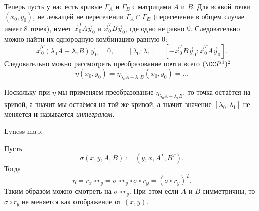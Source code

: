 \documentclass[12pt,a4paper]{article}
\begin{document}
    \begin{definition}
        Теперь пусть у нас есть кривые $\Gamma_A$ и $\Gamma_B$ с матрицами $A$ и $B$. Для всякой точки $(x_0, y_0)$, не лежащей не пересечении $\Gamma_A \cap \Gamma_B$ (пересечение в общем случае имеет 8 точек), имеет $\vec{x}_0^T A \vec{y}_0$ и $\vec{x}_0^T B \vec{y}_0$, где одно не равно $0$. Следовательно можно найти их однородную комбинацию равную $0$:
        \[\vec{x}_0^T (\lambda_0 A + \lambda_1 B) \vec{y}_0 = 0, \qquad [\lambda_0: \lambda_1] = [- \vec{x}_0^T B \vec{y}_0: \vec{x}_0^T A \vec{y}_0].\]
        Следовательно можно рассмотреть преобразование почти всего $(\CC P^1)^2$
        \[
            \eta(x_0, y_0)
            = \eta_{\lambda_0 A + \lambda_1 B}(x_0, y_0)
            = \dots
        \]
    \end{definition}

    \begin{remark}
        Поскольку при $\eta$ мы применяем преобразование $\eta_{\lambda_0 A + \lambda_1 B}$, то точка остаётся на кривой, а значит мы остаёмся на той же кривой, а значит значение $[\lambda_0: \lambda_1]$ не меняется и называется \emph{интегралом}.
    \end{remark}

    Lyness map.

    Пусть
    \[\sigma(x, y, A, B) := (y, x, A^T, B^T).\]
    Тогда
    \[\eta = r_x \circ r_y = \sigma \circ r_y \circ \sigma \circ r_y = (\sigma \circ r_y)^2.\]
    Таким образом можно смотреть на $\sigma \circ r_y$. При этом если $A$ и $B$ симметричны, то $\sigma \circ r_y$ не меняется как отображение от $(x, y)$.
\end{document}
